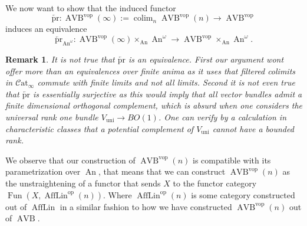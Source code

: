 \documentclass{article}
\newcommand{\op}{\mathrm{op}}
\newcommand{\vop}{\mathrm{vop}}
\newcommand{\pr}{\mathrm{pr}}
\DeclareMathOperator{\AVB}{AVB}
\DeclareMathOperator{\An}{An}
\newcommand{\catinfty}{\mathcal{C}\mathrm{at}_{\infty}}
\DeclareMathOperator{\Fun}{Fun}
\DeclareMathOperator{\AffLin}{AffLin}
\DeclareMathOperator*{\colim}{colim}
\newtheorem{remark}{Remark}
\begin{document}
    We now want to show that the induced functor 
    \[
    \overleftarrow{\pr} \colon \AVB^\vop(\infty) := \colim_n \AVB^\vop(n) \to \AVB^\vop   
    \]
    induces an equivalence 
    \[
    \overleftarrow{\pr}_{\An^\omega} \colon \AVB^\vop(\infty) \times_{\An} \An^\omega \to \AVB^\vop \times_{\An} \An^\omega.
    \]
\begin{remark}
    It is not true that $\overleftarrow{\pr}$ is an equivalence. First our argument 
    wont offer more than an equivalences over finite anima as it uses that 
    filtered colimits in $\catinfty$ commute with finite limits and not all limits. Second it is 
    not even true that $\overleftarrow{\pr}$ is essentially surjective as this would imply that 
    all vector bundles admit a finite dimensional orthogonal complement, which is absurd when one considers 
    the universal rank one bundle $V_{\mathrm{uni}} \to BO(1)$.
    One can verify by a calculation in characteristic classes that a potential complement of 
    $V_\mathrm{uni}$ cannot have a bounded rank.
\end{remark}

    We observe that our construction of $\AVB^\vop(n)$ is compatible with its parametrization 
    over $\An$, that means that we can construct $\AVB^\vop(n)$ as the unstraightening of a functor 
    that sends $X$ to the functor category $\Fun(X, \AffLin^\op(n))$. Where $\AffLin^\op(n)$ is some 
    category constructed out of $\AffLin$ in a similar fashion to how we have constructed $\AVB^\vop(n)$
    out of $\AVB$. 
\end{document}
